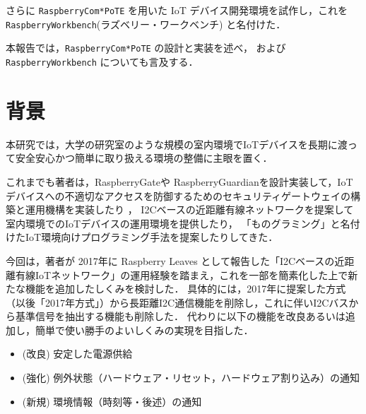 さらに {\tt Raspberry\-Com*PoTE} を用いた IoT デバイス開発環境を試作し，これを
{\tt Raspberry\-Workbench}(ラズベリー・ワークベンチ)
と名付けた．

本報告では，{\tt Raspberry\-Com*PoTE} の設計と実装を述べ，
および {\tt Raspberry\-Workbench} についても言及する．


\section{背景}
\label{sec:02background}

本研究では，大学の研究室のような規模の室内環境でIoTデバイスを長期に渡って安全安心かつ簡単に取り扱える環境の整備に主眼を置く．

これまでも著者は，RaspberryGateや RaspberryGuardianを設計実装して，IoTデバイスへの不適切なアクセスを防御するためのセキュリティゲートウェイの構築と運用機構を実装したり\cite{hohno:RaspberryGate}\cite{hohno:RaspberryGuardian} ，
I2Cベースの近距離有線ネットワークを提案して室内環境でのIoTデバイスの運用環境を提供したり\cite{hohno:I2CwiredLAN-2017}，
「ものグラミング」と名付けたIoT環境向けプログラミング手法を提案したりしてきた\cite{hohno:monogramming2}．

今回は，著者が 2017年に Raspberry Leaves として報告した「I2Cベースの近距離有線IoTネットワーク」の運用経験を踏まえ，これを一部を簡素化した上で新たな機能を追加したしくみを検討した．
具体的には，2017年に提案した方式（以後「2017年方式」）から長距離I2C通信機能を削除し，これに伴いI2Cバスから基準信号を抽出する機能も削除した．
代わりに以下の機能を改良あるいは追加し，簡単で使い勝手のよいしくみの実現を目指した．

\begin{itemize}
\item (改良) 安定した電源供給
\item (強化) 例外状態（ハードウェア・リセット，ハードウェア割り込み）の通知
\item (新規) 環境情報（時刻等・後述）の通知
\end{itemize}

